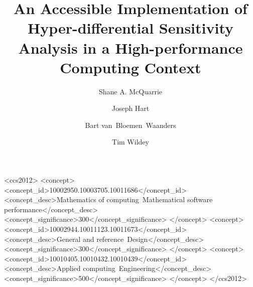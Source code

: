 \documentclass[acmsmall,screen,review]{acmart}
\begin{document}

\title[HDSA with HPC]{An Accessible Implementation of Hyper-differential Sensitivity Analysis in a High-performance Computing Context}

\author{Shane A. McQuarrie}

\author{Joseph Hart}

\author{Bart van~Bloemen~Waanders}

\author{Tim Wildey}


\renewcommand{\shortauthors}{McQuarrie, Hart, van~Bloemen~Waanders, and Wildey}


\begin{abstract}

\end{abstract}

\begin{CCSXML}
<ccs2012>
  <concept>
    <concept_id>10002950.10003705.10011686</concept_id>
    <concept_desc>Mathematics of computing~Mathematical software performance</concept_desc>
    <concept_significance>300</concept_significance>
  </concept>
  <concept>
    <concept_id>10002944.10011123.10011673</concept_id>
    <concept_desc>General and reference~Design</concept_desc>
    <concept_significance>300</concept_significance>
  </concept>
  <concept>
    <concept_id>10010405.10010432.10010439</concept_id>
    <concept_desc>Applied computing~Engineering</concept_desc>
    <concept_significance>500</concept_significance>
  </concept>
</ccs2012>
\end{CCSXML}



\end{document}
